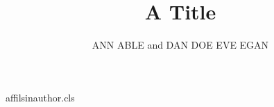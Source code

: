 \begin{filecontents*}[overwrite]{affilsinauthor.cls}
\def\affilfont{\small}
\def\author#1{\gdef\@author{#1}}
\def\affil#1{\gdef\@affil{#1}\ifx\@affil\@empty\else{\reset@font\affilfont\unskip,\ #1\vphantom{gy}\endgraf}\fi}\affil{}
\def\maketitle{\par{\Large\@title\par}{\noindent\@author\par}}
\end{filecontents*}
\documentclass{affilsinauthor}

\title{A Title}
\author{ANN ABLE  and DAN DOE  EVE EGAN }
\maketitle
Body.

